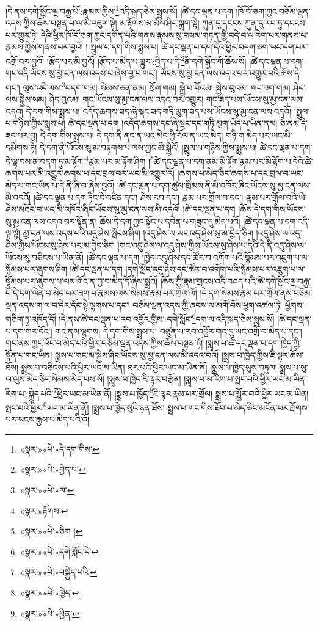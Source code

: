 །དེ་ནས་དགེ་སློང་ལྔ་བརྒྱ་པོ་:རྣམས་ཀྱིས་\footnote{«སྣར་»«པེ་»དེ་དག་གིས་}འདི་སྐད་ཅེས་སྨྲས་སོ། །ཚེ་དང་ལྡན་པ་དག །ཁོ་བོ་ཅག་ཀྱང་བཅོམ་ལྡན་འདས་ཀྱིས་ཆོས་བསྟན་པ་ལ་མི་འཇུག་སྟེ། མ་རྟོགས་མ་མོས་ཤིང་སྐྲག་སྟེ། ཀུན་དུ་དངངས་ཀུན་དུ་རབ་ཏུ་དངངས་པར་གྱུར་ཏེ། དེའི་ཕྱིར་ཁོ་བོ་ཅག་ཀྱང་དགོན་པའི་གནས་རྣམས་སུ་བསམ་གཏན་གྱི་བདེ་བ་ལ་རེག་པར་གནས་པ་རྣམས་ཀྱིས་གནས་པར་བྱའོ། །
སྤྲུལ་པ་དག་གིས་སྨྲས་པ། ཚེ་དང་ལྡན་པ་དག་དེའི་ཕྱིར་བདག་ཅག་ཡང་དག་པར་འགྲོ་བར་བྱའོ། །རྩོད་པར་མི་བྱའོ། །རྩོད་པ་མེད་པ་ལྷུར་:བྱེད་པ་དེ་\footnote{«སྣར་»«པེ་»བྱེད་པ་}ནི་དགེ་སྦྱོང་གི་ཆོས་སོ། །ཚེ་དང་ལྡན་པ་དག་གང་འདི་ཡོངས་སུ་མྱ་ངན་ལས་འདས་པ་ཞེས་བྱ་བ་གང་། ཡོངས་སུ་མྱ་ངན་ལས་འདའ་བར་འགྱུར་བའི་ཆོས་དེ་གང་། ལུས་འདི་ལས་\footnote{«སྣར་»«པེ་»ལ་}བདག་གམ། སེམས་ཅན་ནམ། སྲོག་གམ། སྐྱེ་བ་པོའམ། སྐྱེས་བུའམ། གང་ཟག་གམ། ཤེད་ལས་སྐྱེས་སམ། ཤེད་བུའམ། གང་ཡོངས་སུ་མྱ་ངན་ལས་འདའ་བར་འགྱུར། གང་ཟད་པས་ཡོངས་སུ་མྱ་ངན་ལས་འདའ། དེ་དག་གིས་སྨྲས་པ། འདོད་ཆགས་ཟད་ཞེ་སྡང་ཟད་གཏི་མུག་ཟད་པས་ཡོངས་སུ་མྱ་ངན་ལས་འདའོ། །སྤྲུལ་པ་གཉིས་ཀྱིས་སྨྲས་པ། ཚེ་དང་ལྡན་པ་དག །འདོད་ཆགས་དང་ཞེ་སྡང་དང་གཏི་མུག་ཡོད་པ་ཡིན་ནམ། ཅི་ནམ་དེ་ཟད་པར་བྱ། དེ་དག་གིས་སྨྲས་པ། དེ་དག་ནི་ནང་ན་ཡང་མེད་ཕྱི་རོལ་ན་ཡང་མེད། གཉི་ག་མེད་པར་ཡང་མི་དམིགས་ཏེ། དེ་དག་ནི་ཡོངས་སུ་མ་བརྟགས་པ་ལས་ཀྱང་མི་སྐྱེའོ། །སྤྲུལ་པ་གཉིས་ཀྱིས་སྨྲས་པ། ཚེ་དང་ལྡན་པ་དག་དེ་ལྟ་བས་ན་བདག་ཏུ་མ་རྟོག་\footnote{«སྣར་»རྟོགས་}རྣམ་པར་མ་རྟོག་ཤིག །\footnote{«སྣར་»«པེ་»ཅིག །}ཚེ་དང་ལྡན་པ་དག་ནམ་མི་རྟོག་རྣམ་པར་མི་རྟོག་པ་དེའི་ཚེ་ཆགས་པར་མི་འགྱུར་ཆགས་པ་དང་བྲལ་བར་ཡང་མི་འགྱུར་རོ། །ཆགས་པ་མེད་ཅིང་ཆགས་པ་དང་བྲལ་བ་ཡང་མེད་པ་གང་ཡིན་པ་དེ་ནི་ཞི་བ་ཞེས་བྱའོ། །ཚེ་དང་ལྡན་པ་དག་ཚུལ་ཁྲིམས་ནི་མི་འཁོར་ཞིང་ཡོངས་སུ་མྱ་ངན་ལས་མི་འདའོ། །ཚེ་དང་ལྡན་པ་དག་ཏིང་ངེ་འཛིན་དང་། ཤེས་རབ་དང་། རྣམ་པར་གྲོལ་བ་དང་། རྣམ་པར་གྲོལ་བའི་ཡེ་ཤེས་མཐོང་བ་ཡང་མི་འཁོར་ཞིང་ཡོངས་སུ་མྱ་ངན་ལས་མི་འདའོ། །ཚེ་དང་ལྡན་པ་དག །ཆོས་དེ་དག་གིས་ཡོངས་སུ་མྱ་ངན་ལས་འདའ་བར་སྟོན་ན། ཆོས་དེ་དག་ཀྱང་སྟོང་པ་དབེན་པ་གཟུང་དུ་མེད་པའོ། །ཚེ་དང་ལྡན་པ་དག་འདི་ལྟ་སྟེ། མྱ་ངན་ལས་འདས་པའི་འདུ་ཤེས་སྤོངས་ཤིག །འདུ་ཤེས་ལ་ཡང་འདུ་ཤེས་སུ་མ་བྱེད་ཅིག །འདུ་ཤེས་ལ་འདུ་ཤེས་ཀྱིས་ཡོངས་སུ་ཤེས་པར་མ་བྱེད་ཅིག །གང་འདུ་ཤེས་ལ་འདུ་ཤེས་ཀྱིས་ཡོངས་སུ་ཤེས་པ་དེའི་དེ་ནི་འདུ་ཤེས་ལ་ཡོངས་སུ་བཅིངས་པ་ཡིན་ནོ། །ཚེ་དང་ལྡན་པ་དག །ཁྱེད་འདུ་ཤེས་དང་ཚོར་བ་འགོག་པའི་སྙོམས་པར་འཇུག་པ་ལ་སྙོམས་པར་ཞུགས་ཤིག །ཚེ་དང་ལྡན་པ་དག །དགེ་སློང་འདུ་ཤེས་དང་ཚོར་བ་འགོག་པའི་སྙོམས་པར་འཇུག་པ་ལ་སྙོམས་པར་ཞུགས་པ་ལས་གོང་ན་བྱ་བ་མེད་དོ་ཞེས་སྨྲའོ། །ཆོས་ཀྱི་རྣམ་གྲངས་འདི་བཤད་པའི་ཚེ་དགེ་སློང་ལྔ་བརྒྱ་པོ་དེ་དག་ལེན་པ་མེད་པར་ཟག་པ་རྣམས་ལས་སེམས་རྣམ་པར་གྲོལ་ལོ། །དེ་དག་སེམས་རྣམ་པར་གྲོལ་ནས་བཅོམ་ལྡན་འདས་ག་ལ་བ་དེར་དོང་སྟེ་ལྷགས་པ་དང་། བཅོམ་ལྡན་འདས་ཀྱི་ཞབས་ལ་མགོ་བོས་ཕྱག་འཚལ་ཏེ། ཕྱོགས་གཅིག་ཏུ་འཁོད་དོ། །དེ་ནས་ཚེ་དང་ལྡན་པ་རབ་འབྱོར་གྱིས་:དགེ་སློང་\footnote{«སྣར་»«པེ་»དགེ་སློང་དེ་}དག་ལ་འདི་སྐད་ཅེས་སྨྲས་སོ། །ཚེ་དང་ལྡན་པ་དག་གར་དོང་། གང་ནས་ལྷགས། དེ་དག་གིས་སྨྲས་པ། བཙུན་པ་རབ་འབྱོར་གང་དུ་ཡང་འགྲོ་བ་མེད་པ་དང་། གང་ནས་ཀྱང་འོང་བ་མེད་པའི་ཕྱིར་བཅོམ་ལྡན་འདས་ཀྱིས་ཆོས་བསྟན་ཏོ། །སྨྲས་པ་ཚེ་དང་ལྡན་པ་དག་ཁྱེད་ཀྱི་སྟོན་པ་གང་ཡིན། སྨྲས་པ་གང་མ་སྐྱེས་ཤིང་ཡོངས་སུ་མྱ་ངན་ལས་མི་འདའ་བའོ། །སྨྲས་པ་ཁྱེད་ཀྱིས་ཇི་ལྟར་ཆོས་ཐོས། སྨྲས་པ་བཅིངས་པའི་ཕྱིར་ཡང་མ་ཡིན། ཐར་པའི་ཕྱིར་ཡང་མ་ཡིན་ནོ། །སྨྲས་པ་ཁྱེད་སུས་བཏུལ། སྨྲས་པ་སུ་ལ་ལུས་མེད་ཅིང་སེམས་མེད་པས་སོ། །སྨྲས་པ་ཁྱེད་ཇི་ལྟར་བརྩོན། །སྨྲས་པ་མ་རིག་པ་སྤང་པའི་ཕྱིར་ཡང་མ་ཡིན་རིག་པ་:སྐྱེད་པའི་\footnote{«སྣར་»«པེ་»བསྐྱེད་པའི་}ཕྱིར་ཡང་མ་ཡིན་ནོ། །སྨྲས་པ་ཁྱོད་\footnote{«སྣར་»«པེ་»ཁྱེད་}ཇི་ལྟར་རྣམ་པར་གྲོལ། སྨྲས་པ་སྦྱོར་བའི་ཕྱིར་ཡང་མ་ཡིན། སྤང་བའི་ཕྱིར་\footnote{«སྣར་»«པེ་»ཕྱིན་}ཡང་མ་ཡིན་ནོ། །སྨྲས་པ་ཁྱེད་སུའི་ཉན་ཐོས། སྨྲས་པ་གང་གིས་ཐོབ་པ་མེད་ཅིང་མངོན་པར་རྫོགས་པར་སངས་རྒྱས་པ་མེད་པའི་འོ། 